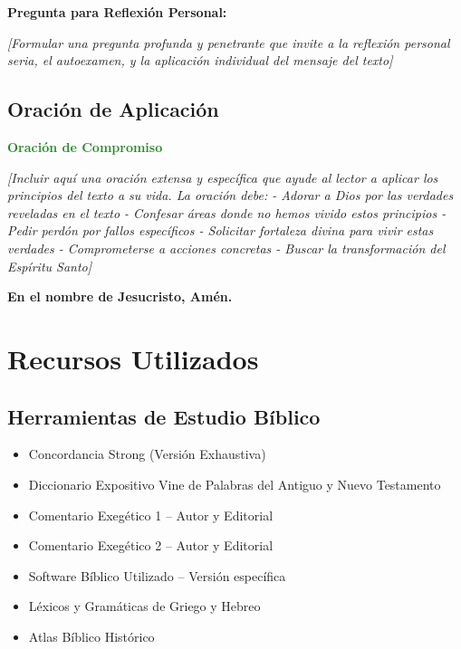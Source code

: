 \documentclass[12pt,a4paper]{article}
\begin{document}
\begin{mdframed}[style=AlertBox]
\textbf{Pregunta para Reflexión Personal:}

\textit{[Formular una pregunta profunda y penetrante que invite a la reflexión personal seria, el autoexamen, y la aplicación individual del mensaje del texto]}
\end{mdframed}

\subsection{Oración de Aplicación}

\begin{center}
\textcolor{forestgreen}{\Large\textbf{Oración de Compromiso}}
\end{center}

\textit{[Incluir aquí una oración extensa y específica que ayude al lector a aplicar los principios del texto a su vida. La oración debe:
- Adorar a Dios por las verdades reveladas en el texto
- Confesar áreas donde no hemos vivido estos principios
- Pedir perdón por fallos específicos
- Solicitar fortaleza divina para vivir estas verdades
- Comprometerse a acciones concretas
- Buscar la transformación del Espíritu Santo]}

\textcolor{olivegreen}{\textbf{En el nombre de Jesucristo, Amén.}}

\newpage
\appendix

\section{Recursos Utilizados}

\subsection{Herramientas de Estudio Bíblico}

\begin{itemize}[leftmargin=1.5em]
    \item Concordancia Strong (Versión Exhaustiva)
    \item Diccionario Expositivo Vine de Palabras del Antiguo y Nuevo Testamento
    \item Comentario Exegético 1 -- Autor y Editorial
    \item Comentario Exegético 2 -- Autor y Editorial  
    \item Software Bíblico Utilizado -- Versión específica
    \item Léxicos y Gramáticas de Griego y Hebreo
    \item Atlas Bíblico Histórico
\end{itemize}
\end{document}
